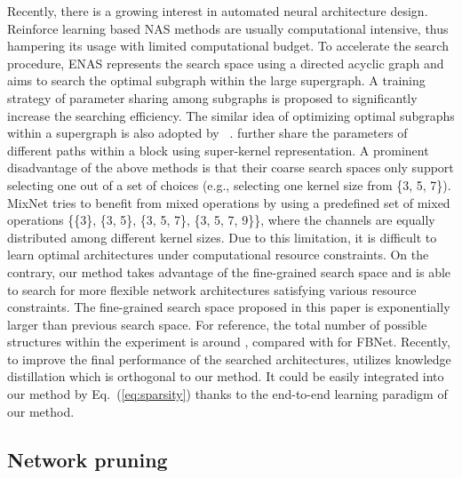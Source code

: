 \documentclass{article} \usepackage{iclr2020_conference,times}
\begin{document}
Recently, there is a growing interest in automated neural architecture design. Reinforce learning based NAS methods \citep{zoph2017nasnet,tan2019mnasnet,tan2019mixnet,mingxing2019efficient} are usually computational intensive, thus hampering its usage with limited computational budget. To accelerate the search procedure, ENAS \citep{hieu2018enas} represents the search space using a directed acyclic graph and aims to search the optimal subgraph within the large supergraph. A training strategy of parameter sharing among subgraphs is proposed to significantly increase the searching efficiency. The similar idea of optimizing optimal subgraphs within a supergraph is also adopted by ~\cite{hanxiao2019darts,jin2019rc_darts,xu2020pc_darts,wu2019fbnet,zichao2019uniform_sampling,han2019proxyless}. \cite{stamoulis2019single_path,yu2020bignas} further share the parameters of different paths within a block using super-kernel representation.
A prominent disadvantage of the above methods is that their coarse search spaces only support selecting one out of a set of choices (e.g., selecting one kernel size from \{3, 5, 7\}). MixNet tries to benefit from mixed operations by using a predefined set of mixed operations \{\{3\}, \{3, 5\}, \{3, 5, 7\}, \{3, 5, 7, 9\}\}, where the channels are equally distributed among different kernel sizes. Due to this limitation, it is difficult to learn optimal architectures under computational resource constraints. On the contrary, our method takes advantage of the fine-grained search space and is able to search for more flexible network architectures satisfying various resource constraints. The fine-grained search space proposed in this paper is exponentially larger than previous search space. For reference, the total number of possible structures within the experiment is around , compared with  for FBNet.
Recently, to improve the final performance of the searched architectures, \cite{yu2020bignas} utilizes knowledge distillation which is orthogonal to our method. It could be easily integrated into our method by Eq.~(\ref{eq:sparsity}) thanks to the end-to-end learning paradigm of our method.

\subsection{Network pruning}
\end{document}
